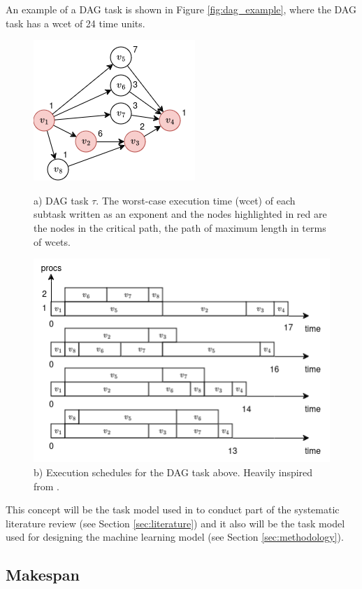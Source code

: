 An example of a DAG task is shown in Figure \ref{fig:dag_example},
where the DAG task has a wcet of 24 time units.

\begin{figure}[htbp]
    \centering
    \includegraphics[width=0.5\linewidth]{images/example_DAG.png}
    \caption{a) DAG task $\tau$. The worst-case execution time (wcet) of each subtask written as an exponent
    and the nodes highlighted in red are the nodes in the critical path, the path of maximum length in terms of wcets.}
    \label{fig:dag_example}
    \includegraphics[width=\linewidth]{images/example_DAG_schedules.png}
    \caption{b) Execution schedules for the DAG task above. Heavily inspired from \citet{zhao2020DAGsched}.}
    \label{fig:dag_schedule_example}
\end{figure}


This concept will be the task model used in to conduct 
part of the systematic literature review (see Section \ref{sec:literature})
and it also will be the task model used for designing 
the machine learning model (see Section \ref{sec:methodology}).

\subsection{Makespan}

